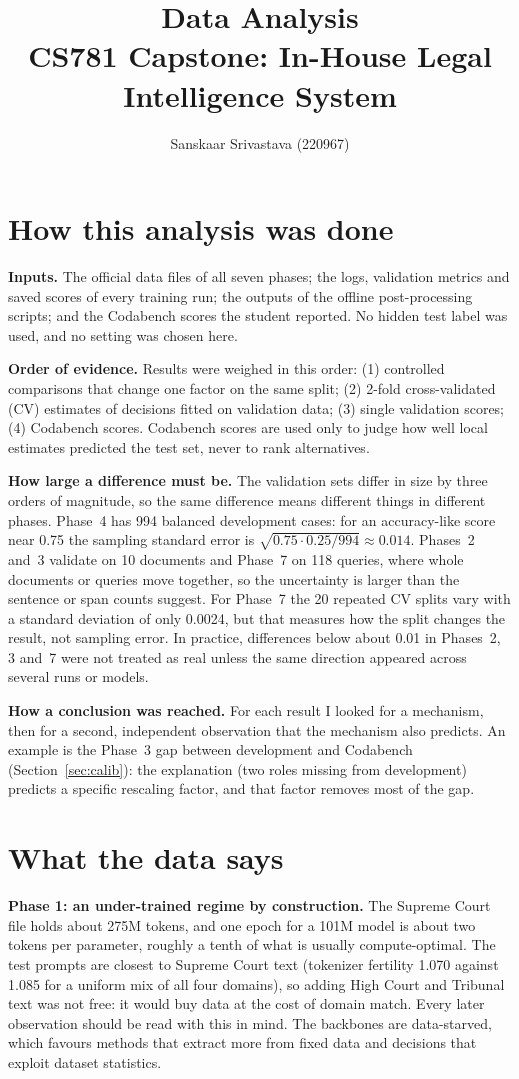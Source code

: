 \documentclass[11pt, oneside]{article}
\title{Data Analysis\\[2pt]
\large CS781 Capstone: In-House Legal Intelligence System}
\author{Sanskaar Srivastava (220967)\\}
\date{}
\begin{document}
\maketitle



\section{How this analysis was done}
\textbf{Inputs.} The official data files of all seven phases; the logs, validation metrics and saved scores of every
training run; the outputs of the offline post-processing scripts; and the Codabench scores the student reported.
No hidden test label was used, and no setting was chosen here.

\textbf{Order of evidence.} Results were weighed in this order: (1) controlled comparisons that change one factor on
the same split; (2) 2-fold cross-validated (CV) estimates of decisions fitted on validation data; (3) single validation
scores; (4) Codabench scores. Codabench scores are used only to judge how well local estimates predicted the test set,
never to rank alternatives.

\textbf{How large a difference must be.} The validation sets differ in size by three orders of magnitude, so the same
difference means different things in different phases. Phase~4 has 994 balanced development cases: for an
accuracy-like score near 0.75 the sampling standard error is $\sqrt{0.75\cdot0.25/994}\approx0.014$. Phases~2 and~3
validate on 10 documents and Phase~7 on 118 queries, where whole documents or queries move together, so the
uncertainty is larger than the sentence or span counts suggest. For Phase~7 the 20 repeated CV splits vary with a
standard deviation of only 0.0024, but that measures how the split changes the result, not sampling error. In practice,
differences below about 0.01 in Phases~2, 3 and~7 were not treated as real unless the same direction appeared across
several runs or models.

\textbf{How a conclusion was reached.} For each result I looked for a mechanism, then for a second, independent
observation that the mechanism also predicts. An example is the Phase~3 gap between development and Codabench
(Section~\ref{sec:calib}): the explanation (two roles missing from development) predicts a specific rescaling factor,
and that factor removes most of the gap.

\section{What the data says}\label{sec:data}
\textbf{Phase 1: an under-trained regime by construction.} The Supreme Court file holds about 275M tokens, and one
epoch for a 101M model is about two tokens per parameter, roughly a tenth of what is usually compute-optimal. The test
prompts are closest to Supreme Court text (tokenizer fertility 1.070 against 1.085 for a uniform mix of all four
domains), so adding High Court and Tribunal text was not free: it would buy data at the cost of domain match. Every
later observation should be read with this in mind. The backbones are data-starved, which favours methods that extract
more from fixed data and decisions that exploit dataset statistics.
\end{document}

